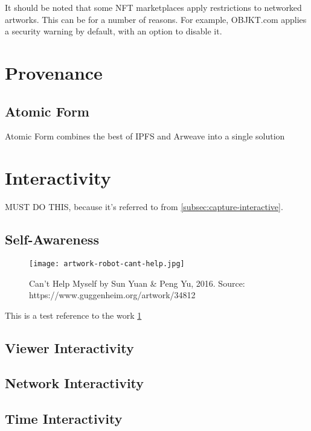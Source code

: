 It should be noted that some NFT marketplaces apply restrictions to networked artworks. This can be for a number of reasons.
For example, OBJKT.com applies a security warning by default, with an option to disable it.




\section{Provenance}

\subsection{Atomic Form}

Atomic Form combines the best of IPFS and Arweave into a single solution \cite{maneliusExtendingNFTMetadata2024}






\section{Interactivity}
\label{sec:interactivity}

\todo MUST DO THIS, because it's referred to from \autoref{subsec:capture-interactive}.


\subsection{Self-Awareness}

\begin{figure}[h]
    \centering
    \texttt{[image: artwork-robot-cant-help.jpg]}
    \caption[Can’t Help Myself by Sun Yuan \& Peng Yu]{Can’t Help Myself by Sun Yuan \& Peng Yu, 2016. Source: https://www.guggenheim.org/artwork/34812}
    \label{fig:robot-canthelp}
\end{figure}


This is a test reference to the work \cref{fig:robot-canthelp}

\subsection{Viewer Interactivity}

\subsection{Network Interactivity}

\subsection{Time Interactivity}

